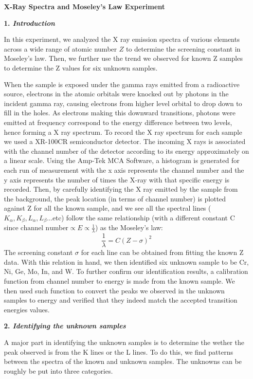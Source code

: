 \documentclass[12pt]{article}
\begin{document}
\textbf{X-Ray Spectra and Moseley’s Law Experiment}
\bigskip

\textbf{1. \textit{Introduction}}
\smallskip

In this experiment, we analyzed the X ray emission spectra of various elements across a wide range of atomic number $Z$ to determine the screening constant in Moseley's law. Then, we further use the trend we observed for known Z samples to determine the Z values for six unknown samples.

When the sample is exposed under the gamma rays emitted from a radioactive source, electrons in the atomic orbitals were knocked out by photons in the incident gamma ray, causing electrons from higher level orbital to drop down to fill in the holes. As electrons making this downward transitions, photons were emitted at frequency correspond to the energy difference between two levels, hence forming a X ray spectrum. To record the X ray spectrum for each sample we used a XR-100CR semiconductor detector. The incoming X rays is associated with the channel number of the detector according to its energy approximately on a linear scale. Using the Amp-Tek MCA Software, a histogram is generated for each run of measurement with the x axis represents the channel number and the y axis represents the number of times the X-ray with that specific energy is recorded. Then, by carefully identifying the X ray emitted by the sample from the background, the peak location (in terms of channel number) is plotted against Z for all the known sample, and we see all the spectral lines ($K_{\alpha}, K_{\beta}, L_{\alpha}, L_{\beta}$...etc) follow the same relationship (with a different constant C since $\text{channel number} \propto E \propto \frac{1}{\lambda}$) as the Moseley's law:
$$\frac{1}{\lambda} = C(Z- \sigma)^2$$
The screening constant $\sigma$ for each line can be obtained from fitting the known Z data. With this relation in hand, we then identified six unknown sample to be Cr, Ni, Ge, Mo, In, and W. To further confirm our identification results, a calibration function from channel number to energy is made from the known sample. We then used such function to convert the peaks we observed in the unknown samples to energy and verified that they indeed match the accepted transition energies values.
\bigskip

\textbf{2. \textit{Identifying the unknown samples}}
\smallskip

A major part in identifying the unknown samples is to determine the wether the peak observed is from the K lines or the L lines. To do this, we find patterns between the spectra of the known and unknown samples. The unknowns can be roughly be put into three categories. 
\end{document}
